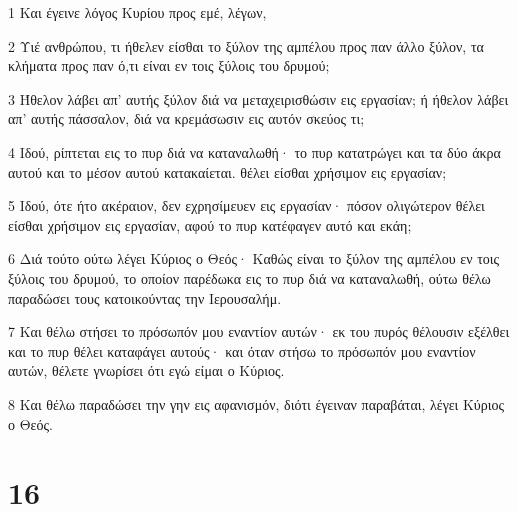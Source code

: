 \par 1 Και έγεινε λόγος Κυρίου προς εμέ, λέγων,
\par 2 Υιέ ανθρώπου, τι ήθελεν είσθαι το ξύλον της αμπέλου προς παν άλλο ξύλον, τα κλήματα προς παν ό,τι είναι εν τοις ξύλοις του δρυμού;
\par 3 Ήθελον λάβει απ' αυτής ξύλον διά να μεταχειρισθώσιν εις εργασίαν; ή ήθελον λάβει απ' αυτής πάσσαλον, διά να κρεμάσωσιν εις αυτόν σκεύος τι;
\par 4 Ιδού, ρίπτεται εις το πυρ διά να καταναλωθή· το πυρ κατατρώγει και τα δύο άκρα αυτού και το μέσον αυτού κατακαίεται. θέλει είσθαι χρήσιμον εις εργασίαν;
\par 5 Ιδού, ότε ήτο ακέραιον, δεν εχρησίμευεν εις εργασίαν· πόσον ολιγώτερον θέλει είσθαι χρήσιμον εις εργασίαν, αφού το πυρ κατέφαγεν αυτό και εκάη;
\par 6 Διά τούτο ούτω λέγει Κύριος ο Θεός· Καθώς είναι το ξύλον της αμπέλου εν τοις ξύλοις του δρυμού, το οποίον παρέδωκα εις το πυρ διά να καταναλωθή, ούτω θέλω παραδώσει τους κατοικούντας την Ιερουσαλήμ.
\par 7 Και θέλω στήσει το πρόσωπόν μου εναντίον αυτών· εκ του πυρός θέλουσιν εξέλθει και το πυρ θέλει καταφάγει αυτούς· και όταν στήσω το πρόσωπόν μου εναντίον αυτών, θέλετε γνωρίσει ότι εγώ είμαι ο Κύριος.
\par 8 Και θέλω παραδώσει την γην εις αφανισμόν, διότι έγειναν παραβάται, λέγει Κύριος ο Θεός.

\chapter{16}

